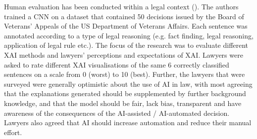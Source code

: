 \begin{table}[!ht]
	\caption{Methods of measuring human evaluation of XAI. Adapted from (\cite{doshi-velez2017})}
	\label{tab:human_eval_xai}
\end{table}

Human evaluation has been conducted within a legal context (\cite{gorski2021}). The authors trained a CNN on a dataset that contained 50 decisions issued by the Board of Veterans' Appeals of the US Department of Veterans Affairs. Each sentence was annotated according to a type of legal reasoning (e.g. fact finding, legal reasoning, application of legal rule etc.). The focus of the research was to evaluate different XAI methods and lawyers' perceptions and expectations of XAI. Lawyers were asked to rate different XAI visualisations of the same 6 correctly classified sentences on a scale from 0 (worst) to 10 (best). Further, the lawyers that were surveyed were generally optimistic about the use of AI in law, with most agreeing that the explanations generated should be supplemented by further background knowledge, and that the model should be fair, lack bias, transparent and have awareness of the consequences of the AI-assisted / AI-automated decision. Lawyers also agreed that AI should increase automation and reduce their manual effort. 

